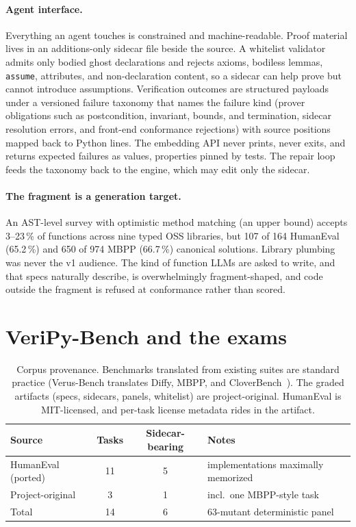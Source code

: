 \documentclass{article}
\newcommand{\benchname}{VeriPy-Bench}
\begin{document}
\paragraph{Agent interface.} Everything an agent touches is constrained
and machine-readable. Proof material lives in an additions-only sidecar
file beside the source. A whitelist validator admits only bodied ghost
declarations and rejects axioms, bodiless lemmas, \texttt{assume},
attributes, and non-declaration content, so a sidecar can help prove but
cannot introduce assumptions. Verification outcomes are structured
payloads under a versioned failure taxonomy that names the failure kind
(prover obligations such as postcondition, invariant, bounds, and
termination, sidecar resolution errors, and front-end conformance
rejections) with source positions mapped back to Python lines. The embedding API never prints, never exits, and returns expected
failures as values, properties pinned by tests. The repair loop feeds the
taxonomy back to the engine, which may edit only the sidecar.

\paragraph{The fragment is a generation target.} An AST-level survey with
optimistic method matching (an upper bound) accepts 3--23\,\% of
functions across nine typed OSS libraries, but 107 of 164 HumanEval
(65.2\,\%) and 650 of 974 MBPP (66.7\,\%) canonical solutions. Library
plumbing was never the v1 audience. The kind of function LLMs are asked
to write, and that specs naturally describe, is overwhelmingly
fragment-shaped, and code outside the fragment is refused at conformance
rather than scored.

\section{\benchname{} and the exams}
\label{sec:exams}

\begin{table}[t]
\centering
\caption{Corpus provenance. Benchmarks translated from existing suites are
standard practice (Verus-Bench translates Diffy, MBPP, and
CloverBench~\cite{autoverus}). The graded artifacts (specs, sidecars,
panels, whitelist) are project-original. HumanEval is MIT-licensed, and
per-task license metadata rides in the artifact.}
\label{tab:corpus}
\small
\begin{tabular}{lccl}
\toprule
Source & Tasks & Sidecar-bearing & Notes \\
\midrule
HumanEval (ported) & 11 & 5 & implementations maximally memorized \\
Project-original & 3 & 1 & incl.\ one MBPP-style task \\
\midrule
Total & 14 & 6 & 63-mutant deterministic panel \\
\bottomrule
\end{tabular}
\end{table}
\end{document}
